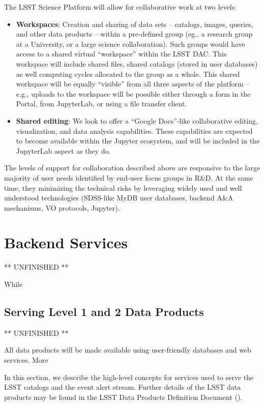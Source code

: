 \documentclass[DM,lsstdraft,toc]{lsstdoc}
\begin{document}
The LSST Science Platform will allow for collaborative work at two levels:
\begin{itemize}
	\item {\bf Workspaces}: Creation and sharing of data sets -- catalogs, images, queries, and other data products -- within a pre-defined group (eg., a research group at a University, or a large science collaboration). Such groups would have access to a shared virtual ``workspace'' within the LSST DAC. This workspace will include shared files, shared catalogs (stored in user databases) as well computing cycles allocated to the group as a whole. This shared workspace will be equally ``visible'' from all three aspects of the platform -- e.g., uploads to the workspace will be possible either through a form in the Portal, from JupyterLab, or using a file transfer client.
	
	\item {\bf Shared editing}: We look to offer a ``Google Docs''-like collaborative editing, visualization, and data analysis capabilities. These capabilities are expected to become available within the Jupyter ecosystem, and will be included in the JupyterLab aspect as they do.
\end{itemize}

The levels of support for collaboration described above are responsive to the large majority of user needs identified by end-user focus groups in R\&D. At the same time, they minimizing the technical risks by leveraging widely used and well understood technologies (SDSS-like MyDB user databases, backend A\&A mechanisms, VO protocols, Jupyter).

\section{Backend Services}

** UNFINISHED **

While 

\subsection{Serving Level 1 and 2 Data Products}

** UNFINISHED **

All data products will be made available using user-friendly databases and web services. More

In this section, we describe the high-level concepts for services used to serve the LSST catalogs and the event alert stream. Further details of the LSST data products may be found in the LSST Data Products Definition Document (\DPDD).
\end{document}
